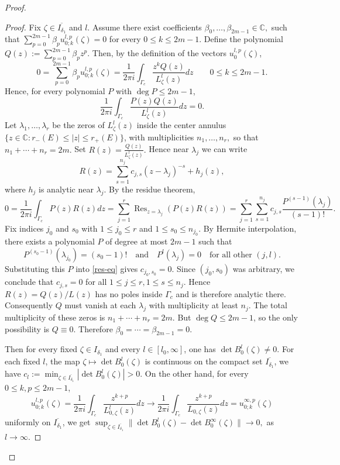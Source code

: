 \documentclass[reqno,11pt]{amsart}
\begin{document}
\begin{proof}
\begin{proof}
Fix $\zeta\in \overline{I_{\delta_1}}$ and $l$. 
Assume there exist coefficients
$
\beta_0,\dots,\beta_{2m-1}\in\mathbb C,
$ such that
$
\sum_{p=0}^{2m-1}\beta_p u^{l,p}_{0;k}(\zeta)=0
$
 for every $0\le k\le 2m-1$.
Define the polynomial
$
Q(z):=\sum_{p=0}^{2m-1}\beta_p z^p.
$
Then, by the definition of the vectors $u_{0}^{l,p}(\zeta)$,
$$
0=\sum_{p=0}^{2m-1}\beta_p u^{l,p}_{0;k}(\zeta)=
\frac{1}{2\pi i}\int_{\Gamma_c}\frac{z^k Q(z)}{L_\zeta^l(z)} dz
\qquad 0\le k\le 2m-1.
$$
Hence, for every polynomial $P$ with $\deg P\le 2m-1$,
$$
\frac{1}{2\pi i}\int_{\Gamma_c}\frac{P(z)Q(z)}{L_\zeta^l(z)}dz=0.
$$
Let $\lambda_1,\dots,\lambda_r$ be the zeros of $L_\zeta^l(z)$ inside the center annulus $\{z\in\mathbb C: r_-(E) \le |z| \le r_+(E)\}$, with multiplicities
$
n_1,\dots,n_r,
$
so that
$
n_1+\cdots+n_r=2m.
$
Set
$
R(z)=\frac{Q(z)}{{L_\zeta^l(z)}}.
$
 Hence near $\lambda_j$ we can write
$$
R(z)=\sum_{s=1}^{n_j}c_{j,s}(z-\lambda_j)^{-s}+h_j(z),
$$
where $h_j$ is analytic near $\lambda_j$.
By the residue theorem,
\begin{equation}\label{res-eq}
    0=\frac{1}{2\pi i}\int_{\Gamma_c}P(z)R(z) dz
=\sum_{j=1}^{r}
\operatorname{Res}_{z=\lambda_j}(P(z)R(z))=\sum_{j=1}^{r}\sum_{s=1}^{n_j}
c_{j,s}\frac{P^{(s-1)}(\lambda_j)}{(s-1)!}.
\end{equation}
Fix indices $j_0$ and $s_0$ with $1\le j_0\le r$ and
$1\le s_0\le n_{j_0}$. By Hermite interpolation,
there exists a polynomial $P$ of degree at most $2m-1$ such that 
$$
P^{(s_0-1)}(\lambda_{j_0})=(s_0-1)! \quad \text{and}\quad P^{l}(\lambda_j)=0 \quad\text{for all other }(j,l).
$$
Substituting this $P$ into \eqref{res-eq} gives
$c_{j_0,s_0}=0.$
Since $(j_0,s_0)$ was arbitrary, we conclude that
$c_{j,s}=0$ for all  $1\leq j\le r,1\le s\le n_j.$
Hence $R(z)=Q(z)/L(z)$ has no poles inside $\Gamma_c$ and is therefore
analytic there. Consequently $Q$ must vanish at each $\lambda_j$ with
multiplicity at least $n_j$. The total multiplicity of these zeros is
$n_1+\cdots+n_r=2m.$
But $\deg Q\le 2m-1$, so the only possibility is
$Q\equiv 0.$
Therefore $\beta_0=\cdots=\beta_{2m-1}=0$.


 Then for every fixed $\zeta\in I_{\delta_1}$ and every
$l\in [l_0,\infty]$, one has
$
\det B_0^l(\zeta)\neq 0.
$
For each fixed $l$, the map
$
\zeta\mapsto \det B_0^l(\zeta)
$
is continuous on the compact set $\overline{I_{\delta_1}}$, we have
$
c_l:=\min_{\zeta\in\overline{I_{\delta_1}}}| \det B_0^l(\zeta)|>0.
$ On the other hand, for every $0\le k,p\le 2m-1$,
$$
u_{0;k}^{l,p}(\zeta)
=\frac{1}{2\pi i}\int_{\Gamma_c}\frac{z^{k+p}}{L_{0,\zeta}^{l}(z)}dz\to
\frac{1}{2\pi i}\int_{\Gamma_c}\frac{z^{k+p}}{L_{0,\zeta}(z)}dz
=u_{0;k}^{\infty,p}(\zeta)
$$
uniformly on $\overline{I_{\delta_1}}$, we get
$
\sup_{\zeta\in\overline{I_{\delta_1}}}
\|\det B_0^l(\zeta)-\det B_0^\infty(\zeta)\|\to 0, 
$ as $l\to\infty$.


\end{proof}
\end{proof}
\end{document}
